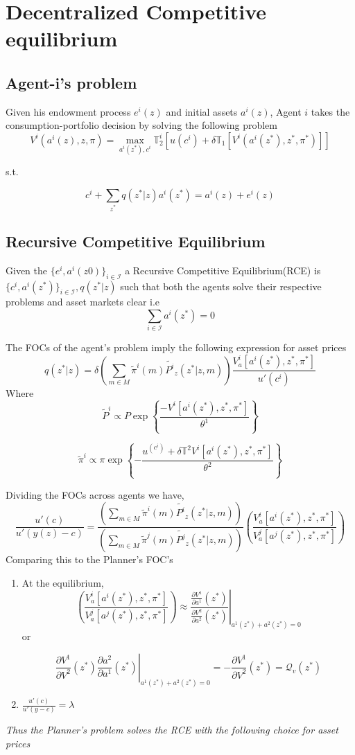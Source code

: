 \documentclass[12pt]{article}
\begin{document}
\section{Decentralized Competitive equilibrium}
\subsection{Agent-i's problem}
Given his endowment process $e^i(z)$ and initial assets $a^i(z)$, Agent $i$ takes the consumption-portfolio decision by solving the following problem
\[V^i(a^i(z),z,\pi)=\max_{a^i(z^*),c^i}\mathbb{T}^i_2\left[ u(c^i)+\delta\mathbb{T}_1\left[V^i(a^i(z^*),z^*,\pi^*)\right]\right]\]

s.t.

\[c^i+\sum_{z^*} q(z^* | z)a^i(z^*)=a^i(z)+e^i(z)\]

\subsection{Recursive Competitive Equilibrium}
\noindent Given the $\{e^i,a^i(z0)\}_{i\in\mathcal{I}}$ a Recursive Competitive Equilibrium(RCE) is $\{c^i,a^i(z^*)\}_{i \in \mathcal{I}}, q(z^*|z)$ such that both the agents solve their respective problems and asset markets clear i.e
\[\sum_{i \in \mathcal{I}}a^i(z^*)=0\]

\noindent The FOCs of the agent's problem imply the following expression for asset prices 
\[q(z^*|z)=\delta \left(\sum_{m \in M}\tilde{\pi}^i(m)\tilde{P^i}_z(z^* |z,m)\right)\frac{V^i_a[a^i(z^*),z^*,\pi^*]}{u'(c^i)}\]
Where
\[\tilde{P}^i  \propto P\exp\left\{\frac{-V^i[a^i(z^*),z^*,\pi^*]}{\theta^1}\right\}\]

\[\tilde{\pi}^i  \propto \pi \exp\left\{-\frac{ u^(c^i)+\delta \mathbb{T}^2 V^i[a^i(z^*),z^*,\pi^*] }{\theta^2}\right\} \]

Dividing the FOCs across agents we have,
\[\frac{u'(c)}{u'(y(z)-c)}=\frac{\left(\sum_{m \in M}\tilde{\pi}^i(m)\tilde{P^i}_z(z^* |z,m)\right)}{\left(\sum_{m \in M}\tilde{\pi}^j(m)\tilde{P^j}_z(z^* |z,m)\right)}\left(\frac{V^i_a[a^i(z^*),z^*,\pi^*]}{V^j_a[a^j(z^*),z^*,\pi^*]}\right)\]
Comparing this to the Planner's FOC's
\begin{enumerate}
\item At the equilibrium,
\[\left(\frac{V^i_a[a^i(z^*),z^*,\pi^*]}{V^j_a[a^j(z^*),z^*,\pi^*]}\right)\approx \left.\frac{\frac{\partial V^1}{\partial a^1}(z^*)}{\frac{\partial V^2}{\partial a^2}(z^*)}\right |_{a^1(z^*)+a^2(z^*)=0}\]
or

\[\left.\frac{\partial V^1}{\partial V^2}(z^*)\frac{\partial a^2}{\partial a^1}(z^*)\right |_{a^1(z^*)+a^2(z^*)=0}=-\frac{\partial V^1}{\partial V^2}(z^*)=\textbf{$\mathcal{Q}_v(z^*)$}\]
\item $\frac{u'(c)}{u'(y-c)}=\lambda $

\end{enumerate}
\emph{Thus the Planner's problem solves the RCE with the following choice for asset prices}
\end{document}
